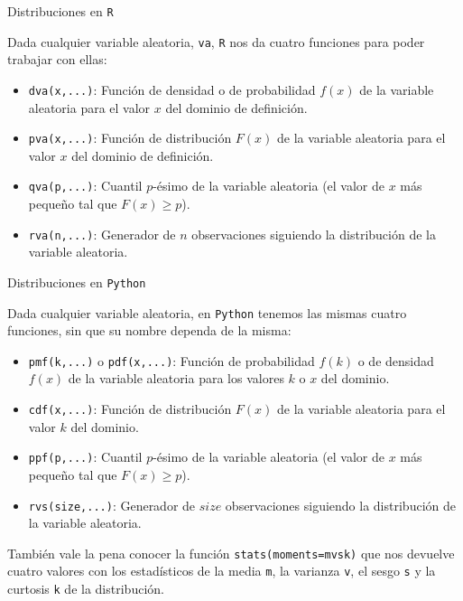 \documentclass[
  ignorenonframetext,
]{beamer}
\providecommand{\tightlist}{%
  \setlength{\itemsep}{0pt}\setlength{\parskip}{0pt}}
\begin{document}
\begin{frame}[fragile]{Distribuciones en \texttt{R}}
\protect\hypertarget{distribuciones-en-r}{}

Dada cualquier variable aleatoria, \texttt{va}, \texttt{R} nos da cuatro
funciones para poder trabajar con ellas:

\begin{itemize}
\tightlist
\item
  \texttt{dva(x,...)}: Función de densidad o de probabilidad \(f(x)\) de
  la variable aleatoria para el valor \(x\) del dominio de definición.
\item
  \texttt{pva(x,...)}: Función de distribución \(F(x)\) de la variable
  aleatoria para el valor \(x\) del dominio de definición.
\item
  \texttt{qva(p,...)}: Cuantil \(p\)-ésimo de la variable aleatoria (el
  valor de \(x\) más pequeño tal que \(F(x)\geq p\)).
\item
  \texttt{rva(n,...)}: Generador de \(n\) observaciones siguiendo la
  distribución de la variable aleatoria.
\end{itemize}

\end{frame}

\begin{frame}[fragile]{Distribuciones en \texttt{Python}}
\protect\hypertarget{distribuciones-en-python}{}

Dada cualquier variable aleatoria, en \texttt{Python} tenemos las mismas
cuatro funciones, sin que su nombre dependa de la misma:

\begin{itemize}
\tightlist
\item
  \texttt{pmf(k,...)} o \texttt{pdf(x,...)}: Función de probabilidad
  \(f(k)\) o de densidad \(f(x)\) de la variable aleatoria para los
  valores \(k\) o \(x\) del dominio.
\item
  \texttt{cdf(x,...)}: Función de distribución \(F(x)\) de la variable
  aleatoria para el valor \(k\) del dominio.
\item
  \texttt{ppf(p,...)}: Cuantil \(p\)-ésimo de la variable aleatoria (el
  valor de \(x\) más pequeño tal que \(F(x)\geq p\)).
\item
  \texttt{rvs(size,...)}: Generador de \(size\) observaciones siguiendo
  la distribución de la variable aleatoria.
\end{itemize}

También vale la pena conocer la función
\texttt{stats(moments=\textquotesingle{}mvsk\textquotesingle{})} que nos
devuelve cuatro valores con los estadísticos de la media \texttt{m}, la
varianza \texttt{v}, el sesgo \texttt{s} y la curtosis \texttt{k} de la
distribución.

\end{frame}
\end{document}
